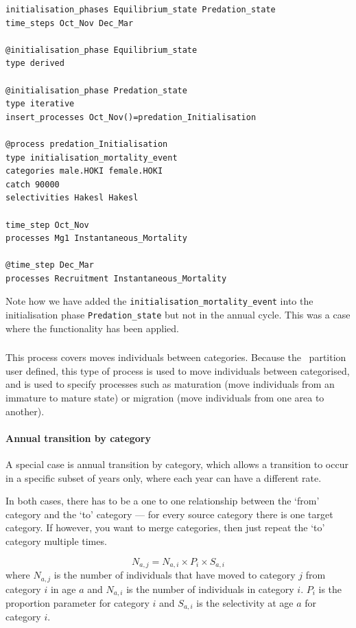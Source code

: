 {\small{\begin{verbatim}
initialisation_phases Equilibrium_state Predation_state
time_steps Oct_Nov Dec_Mar

@initialisation_phase Equilibrium_state 
type derived

@initialisation_phase Predation_state
type iterative
insert_processes Oct_Nov()=predation_Initialisation

@process predation_Initialisation
type initialisation_mortality_event
categories male.HOKI female.HOKI
catch 90000
selectivities Hakesl Hakesl

time_step Oct_Nov
processes Mg1 Instantaneous_Mortality

@time_step Dec_Mar 
processes Recruitment Instantaneous_Mortality
\end{verbatim}}}

Note how we have added the \texttt{initialisation\_mortality\_event} into the initialisation phase \texttt{Predation\_state} but not in the annual cycle. This was a case where the functionality has been applied.



\subsubsection{}

This process covers moves individuals between categories. Because the \CNAME\ partition user defined, this type of process is used to move individuals between categorised, and is used to specify processes such as maturation (move individuals from an immature to mature state) or migration (move individuals from one area to another). 

\paragraph{Annual transition by category}

A special case is annual transition by category, which allows a transition to occur in a specific subset of years only, where each year can have a different rate.

In both cases, there has to be a one to one relationship between the `from' category and the `to' category --- for every source category there is one target category. If however, you want to merge categories, then just repeat the `to' category multiple times. 

\begin{equation}
	N_{a,j} = N_{a,i} \times P_i \times S_{a,i}
\end{equation}
where $N_{a,j}$ is the number of individuals that have moved to category $j$ from category $i$ in age $a$ and $N_{a,i}$ is the number of individuals in category $i$. $P_i$ is the proportion parameter for category $i$ and $S_{a,i}$ is the selectivity at age $a$ for category $i$.

